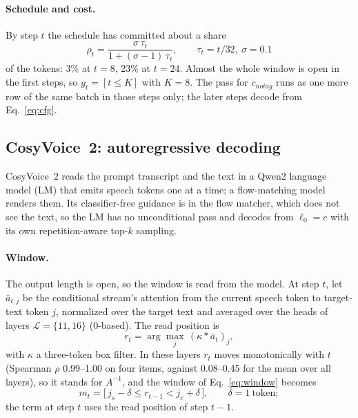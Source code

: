 \documentclass[11pt]{article}
\newcommand{\nt}{\textit{notag}}
\begin{document}
\paragraph{Schedule and cost.} By step $t$ the schedule has committed about a share
\begin{equation}
\rho_t = \frac{\sigma\,\tau_t}{1 + (\sigma - 1)\,\tau_t}, \qquad \tau_t = t/32,\ \sigma = 0.1
\label{eq:rho}
\end{equation}
of the tokens: 3\% at $t = 8$, 23\% at $t = 24$. Almost the whole window is open in the first steps, so $g_t = [t \le K]$ with $K = 8$. The pass for $c_{\nt}$ runs as one more row of the same batch in those steps only; the later steps decode from Eq.~\eqref{eq:cfg}.

\subsection{CosyVoice~2: autoregressive decoding}
\label{sec:impl-cosy}
CosyVoice~2 \citep{du2024cosyvoice2} reads the prompt transcript and the text in a Qwen2 language model (LM) that emits speech tokens one at a time; a flow-matching model renders them. Its classifier-free guidance is in the flow matcher, which does not see the text, so the LM has no unconditional pass and decodes from $\ell_0 = c$ with its own repetition-aware top-$k$ sampling.

\paragraph{Window.} The output length is open, so the window is read from the model. At step $t$, let $\bar a_{t,j}$ be the conditional stream's attention from the current speech token to target-text token $j$, normalized over the target text and averaged over the heads of layers $\mathcal L = \{11, 16\}$ (0-based). The read position is
\begin{equation}
r_t = \arg\max_j\,(\kappa * \bar a_t)_j,
\label{eq:read}
\end{equation}
with $\kappa$ a three-token box filter. In these layers $r_t$ moves monotonically with $t$ (Spearman $\rho$ 0.99--1.00 on four items, against 0.08--0.45 for the mean over all layers), so it stands for $A^{-1}$, and the window of Eq.~\eqref{eq:window} becomes
\begin{equation}
m_t = \big[\,j_s - \delta \le r_{t-1} < j_e + \delta\,\big], \qquad \delta = 1\ \text{token};
\label{eq:window-cosy}
\end{equation}
the term at step $t$ uses the read position of step $t-1$.
\end{document}
